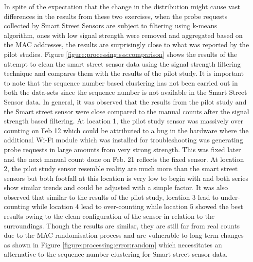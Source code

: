 In spite of the expectation that the change in the distribution might cause vast differences in the results from these two exercises, when the probe requests collected by Smart Street Sensors are subject to filtering using k-means algorithm, ones with low signal strength were removed and aggregated based on the MAC addresses, the results are surprisingly close to what was reported by the pilot studies.
Figure \ref{figure:processing:sss:comparison} shows the results of the attempt to clean the smart street sensor data using the signal strength filtering technique and compares them with the results of the pilot study.
It is important to note that the sequence number based clustering has not been carried out in both the data-sets since the sequence number is not available in the Smart Street Sensor data.
In general, it was observed that the results from the pilot study and the Smart street sensor were close compared to the manual counts after the signal strength based filtering.
At location 1, the pilot study sensor was massively over counting on Feb 12 which could be attributed to a bug in the hardware where the additional Wi-Fi module which was installed for troubleshooting was generating probe requests in large amounts from very strong strength.
This was fixed later and the next manual count done on Feb. 21 reflects the fixed sensor.
At location 2, the pilot study sensor resemble reality are much more than the smart street sensors but both footfall at this location is very low to begin with and both series show similar trends and could be adjusted with a simple factor.
It was also observed that similar to the results of the pilot study, location 3 lead to under-counting while location 4 lead to over-counting while location 5 showed the best results owing to the clean configuration of the sensor in relation to the surroundings.
Though the results are similar, they are still far from real counts due to the MAC randomisation process and are vulnerable to long term changes as shown in Figure \ref{figure:processing:error:random} which necessitates an alternative to the sequence number clustering for Smart street sensor data.


